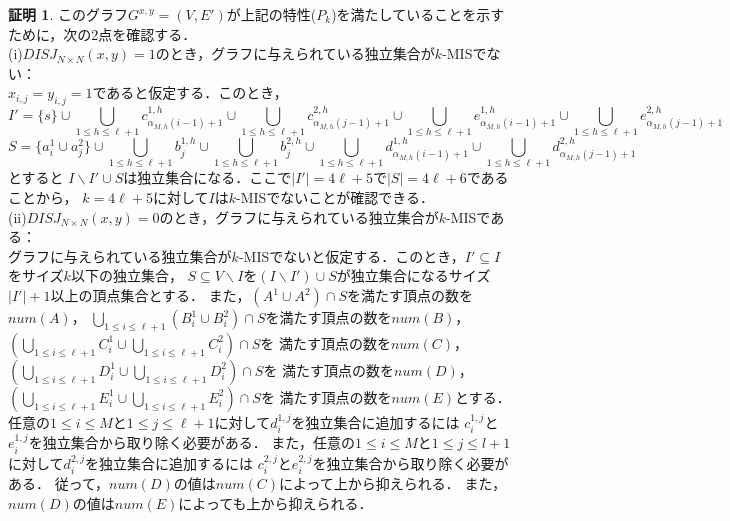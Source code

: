 \documentclass[12pt]{thesis}
\theoremstyle{definition}
\newtheorem*{prf*}{証明}
\begin{document}
\begin{prf*}
このグラフ$G^{x, y} = (V, E')$が上記の特性($P_{k}$)を満たしていることを示すために，次の2点を確認する． \\
(i)$DISJ_{N \times N} (x, y) = 1$のとき，グラフに与えられている独立集合が$k$-MISでない： \\
$x_{i,j}=y_{i,j}=1$であると仮定する．このとき，
\begin{dmath*}
I'=\{s\} \cup \bigcup_{1\leq h \leq \ell+1}c^{1,h}_{\alpha_{M,h}(i-1)+1} \cup 
\bigcup_{1\leq h \leq \ell+1}c^{2,h}_{\alpha_{M,h}(j-1)+1} \cup 
\bigcup_{1\leq h \leq \ell+1}e^{1,h}_{\alpha_{M,h}(i-1)+1} \cup 
\bigcup_{1\leq h \leq \ell+1}e^{2,h}_{\alpha_{M,h}(j-1)+1}
\end{dmath*}
\begin{dmath*}
S=\{a^{1}_{i} \cup a^{2}_{j}\} \cup 
\bigcup_{1\leq h \leq \ell+1}b^{1,h}_{j} \cup 
\bigcup_{1\leq h \leq \ell+1}b^{2,h}_{j} \cup 
\bigcup_{1\leq h \leq \ell+1}d^{1,h}_{\alpha_{M,h}(i-1)+1} \cup  
\bigcup_{1\leq h \leq \ell+1}d^{2,h}_{\alpha_{M,h}(j-1)+1}
\end{dmath*}
とすると
$I \backslash I' \cup S$は独立集合になる．ここで$|I'|=4\ell+5$で$|S|=4\ell+6$であることから，
$k=4\ell+5$に対して$I$は$k$-MISでないことが確認できる． \\
(ii)$DISJ_{N \times N} (x, y) = 0$のとき，グラフに与えられている独立集合が$k$-MISである： \\ 
グラフに与えられている独立集合が$k$-MISでないと仮定する．このとき，$I'\subseteq I$をサイズ$k$以下の独立集合，
$S\subseteq V\backslash I$を$(I \backslash I') \cup S$が独立集合になるサイズ$|I'|+1$以上の頂点集合とする．
また，$(A^{1}\cup A^{2}) \cap S$を満たす頂点の数を$num(A)$，
$\bigcup_{1\leq i \leq \ell+1}(B_{i}^{1} \cup B_{i}^{2}) \cap S$を満たす頂点の数を$num(B)$，
$\left(\bigcup_{1\leq i \leq \ell+1}C_{i}^{1} \cup \bigcup_{1\leq i \leq \ell+1}C_{i}^{2}\right) \cap S$を
満たす頂点の数を$num(C)$，
$\left(\bigcup_{1\leq i \leq \ell+1}D_{i}^{1} \cup \bigcup_{1\leq i \leq \ell+1}D_{i}^{2}\right) \cap S$を
満たす頂点の数を$num(D)$，\\
$\left(\bigcup_{1\leq i \leq \ell+1}E_{i}^{1} \cup \bigcup_{1\leq i \leq \ell+1}E_{i}^{2}\right) \cap S$を
満たす頂点の数を$num(E)$とする．
任意の$1\leq i \leq M$と$1\leq j \leq \ell+1$に対して$d^{1,j}_{i}$を独立集合に追加するには
$c^{1,j}_{i}$と$e^{1,j}_{i}$を独立集合から取り除く必要がある．
また，任意の$1\leq i \leq M$と$1\leq j \leq l+1$に対して$d^{2,j}_{i}$を独立集合に追加するには
$c^{2,j}_{i}$と$e^{2,j}_{i}$を独立集合から取り除く必要がある．
従って，$num(D)$の値は$num(C)$によって上から抑えられる．
また，$num(D)$の値は$num(E)$によっても上から抑えられる．

\end{prf*}
\end{document}
